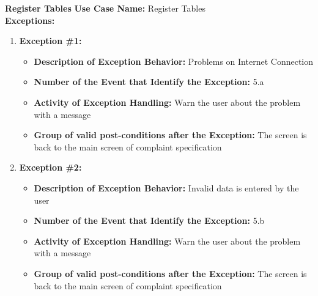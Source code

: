 \documentclass[11pt,twoside]{article}
\begin{document}
\textbf{Register Tables}
\textbf{Use Case Name:} Register Tables\\
\textbf{Exceptions:}
\begin{enumerate}
 \item \textbf{Exception \#1:}
 \begin{itemize}
  \item \textbf{Description of Exception Behavior:} Problems on Internet Connection
  \item \textbf{Number of the Event that Identify the Exception:} 5.a
  \item \textbf{Activity of Exception Handling:} Warn the user about the problem with a message
  \item \textbf{Group of valid post-conditions after the Exception:} The screen is back to the main screen of complaint specification
 \end{itemize}
 \item \textbf{Exception \#2:}
 \begin{itemize}
  \item \textbf{Description of Exception Behavior:} Invalid data is entered by the user
  \item \textbf{Number of the Event that Identify the Exception:} 5.b
  \item \textbf{Activity of Exception Handling:} Warn the user about the problem with a message
  \item \textbf{Group of valid post-conditions after the Exception:} The screen is back to the main screen of complaint specification
 \end{itemize}
\end{enumerate}
\end{document}
